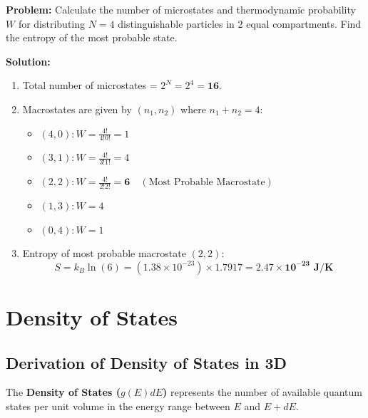 \documentclass[12pt,a4paper]{article}
\begin{document}
\begin{tcolorbox}[examplebox, title={\textbf{Solved Problem 1: Microstates and Entropy}}]
\textbf{Problem:} Calculate the number of microstates and thermodynamic probability $W$ for distributing $N = 4$ distinguishable particles in 2 equal compartments. Find the entropy of the most probable state.

\textbf{Solution:}\par\noindent
\begin{enumerate}[leftmargin=*, itemsep=2pt]
  \item Total number of microstates = $2^N = 2^4 = \mathbf{16}$.
  \item Macrostates are given by $(n_1, n_2)$ where $n_1 + n_2 = 4$:
  \begin{itemize}[leftmargin=*, itemsep=1pt]
    \item $(4,0): W = \frac{4!}{4!0!} = 1$
    \item $(3,1): W = \frac{4!}{3!1!} = 4$
    \item $(2,2): W = \frac{4!}{2!2!} = \mathbf{6} \quad (\text{Most Probable Macrostate})$
    \item $(1,3): W = 4$
    \item $(0,4): W = 1$
  \end{itemize}
  \item Entropy of most probable macrostate $(2,2)$:
   \begin{equation}
   S = k_B \ln(6) = (1.38 \times 10^{-23}) \times 1.7917 = \mathbf{2.47 \times 10^{-23}\text{ J/K}}
   \end{equation}
\end{enumerate}
\end{tcolorbox}

\section{Density of States}

\subsection{Derivation of Density of States in 3D}

The \textbf{Density of States ($g(E)dE$)} represents the number of available quantum states per unit volume in the energy range between $E$ and $E + dE$.
\end{document}
